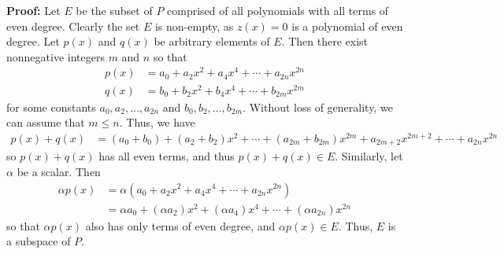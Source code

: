 {\bf{Proof:}} Let $E$ be the subset of $P$ comprised of all polynomials with all terms of even degree.  Clearly the set $E$ is non-empty, as $z(x) = 0$ is a polynomial of even degree.  Let $p(x)$ and $q(x)$ be arbitrary elements of $E$.  Then there exist nonnegative integers $m$ and $n$ so that 
\begin{align*}
p(x) &= a_0 + a_2 x^2 + a_4 x^4 + \cdots + a_{2n}x^{2n}\\
q(x) &= b_0 + b_2 x^2 + b_4 x^4 + \cdots + b_{2m}x^{2m}
\end{align*}
for some constants $a_0, a_2, \ldots, a_{2n}$ and $b_0, b_2, \ldots, b_{2m}$.  Without loss of generality, we can assume that $m \le n$.  Thus, we have 
%
\begin{align*}
p(x) + q(x) 
&= (a_0 + b_0) + (a_2 + b_2)x^2 + \cdots + (a_{2m} + b_{2m})x^{2m} + a_{2m +2} x^{2m+2} + \cdots + a_{2n} x^{2n}
\end{align*}
%
so $p(x) + q(x)$ has all even terms, and thus $p(x) + q(x) \in E$.  Similarly, let $\alpha$ be a scalar.  Then
\begin{align*} 
\alpha p(x) &= \alpha (a_0 + a_2 x^2 + a_4 x^4 + \cdots + a_{2n}x^{2n}) \\
&= \alpha a_0 + (\alpha a_2) x^2 + (\alpha a_4) x^4 + \cdots + (\alpha a_{2n})x^{2n}
\end{align*}
so that $\alpha p(x)$ also has only terms of even degree, and $\alpha p(x) \in E$. Thus, $E$ is a subspace of $P$.